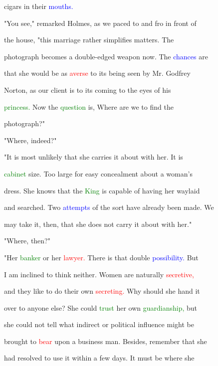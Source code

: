  cigars in their \textcolor{blue}{mouths.}



 "You see," remarked Holmes, as we paced to and fro in front of

 the house, "this \textcolor{BurntOrange}{marriage} rather simplifies matters. The

 photograph becomes a double-edged weapon now. The \textcolor{blue}{chances} are

 that she would be as \textcolor{red}{averse} to its being seen by Mr. Godfrey

 Norton, as our client is to its coming to the eyes of his

 \textcolor{green}{princess.} Now the \textcolor{green}{question} is, Where are we to find the

 photograph?"



 "Where, indeed?"



 "It is most unlikely that she carries it about with her. It is

 \textcolor{green}{cabinet} size. Too large for easy \textcolor{BurntOrange}{concealment} about a woman's

 dress. She knows that the \textcolor{green}{King} is capable of having her waylaid

 and searched. Two \textcolor{blue}{attempts} of the sort have already been made. We

 may take it, then, that she does not carry it about with her."



 "Where, then?"



 "Her \textcolor{green}{banker} or her \textcolor{red}{lawyer.} There is that double \textcolor{blue}{possibility.} But

 I am inclined to think neither. Women are naturally \textcolor{red}{secretive,}

 and they like to do their own \textcolor{red}{secreting.} Why should she hand it

 over to anyone else? She could \textcolor{green}{trust} her own \textcolor{green}{guardianship,} but

 she could not tell what indirect or political \textcolor{BurntOrange}{influence} might be

 brought to \textcolor{red}{bear} upon a business man. Besides, remember that she

 had resolved to use it within a few days. It must be where she

